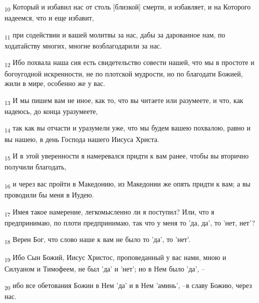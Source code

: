 \begin{tcolorbox}
\textsubscript{10} Который и избавил нас от столь [близкой] смерти, и избавляет, и на Которого надеемся, что и еще избавит,
\end{tcolorbox}
\begin{tcolorbox}
\textsubscript{11} при содействии и вашей молитвы за нас, дабы за дарованное нам, по ходатайству многих, многие возблагодарили за нас.
\end{tcolorbox}
\begin{tcolorbox}
\textsubscript{12} Ибо похвала наша сия есть свидетельство совести нашей, что мы в простоте и богоугодной искренности, не по плотской мудрости, но по благодати Божией, жили в мире, особенно же у вас.
\end{tcolorbox}
\begin{tcolorbox}
\textsubscript{13} И мы пишем вам не иное, как то, что вы читаете или разумеете, и что, как надеюсь, до конца уразумеете,
\end{tcolorbox}
\begin{tcolorbox}
\textsubscript{14} так как вы отчасти и уразумели уже, что мы будем вашею похвалою, равно и вы нашею, в день Господа нашего Иисуса Христа.
\end{tcolorbox}
\begin{tcolorbox}
\textsubscript{15} И в этой уверенности я намеревался придти к вам ранее, чтобы вы вторично получили благодать,
\end{tcolorbox}
\begin{tcolorbox}
\textsubscript{16} и через вас пройти в Македонию, из Македонии же опять придти к вам; а вы проводили бы меня в Иудею.
\end{tcolorbox}
\begin{tcolorbox}
\textsubscript{17} Имея такое намерение, легкомысленно ли я поступил? Или, что я предпринимаю, по плоти предпринимаю, так что у меня то 'да, да', то 'нет, нет'?
\end{tcolorbox}
\begin{tcolorbox}
\textsubscript{18} Верен Бог, что слово наше к вам не было то 'да', то 'нет'.
\end{tcolorbox}
\begin{tcolorbox}
\textsubscript{19} Ибо Сын Божий, Иисус Христос, проповеданный у вас нами, мною и Силуаном и Тимофеем, не был 'да' и 'нет'; но в Нем было 'да', --
\end{tcolorbox}
\begin{tcolorbox}
\textsubscript{20} ибо все обетования Божии в Нем 'да' и в Нем 'аминь', --в славу Божию, через нас.
\end{tcolorbox}
